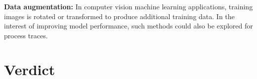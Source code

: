 \noindent\textbf{Data augmentation:} In computer vision machine learning applications, training images is rotated or transformed to produce additional training data. In the interest of improving model performance, such methods could also be explored for process traces.

\section{Verdict} \label{sec:conclusion:verdict}
